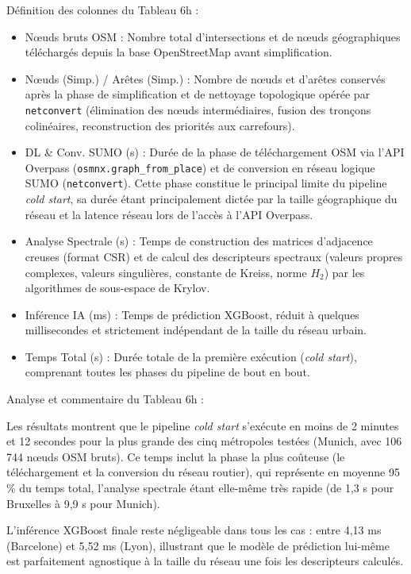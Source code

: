 \documentclass[10pt, a4paper]{article}
\providecommand{\tightlist}{}
\begin{document}
Définition des colonnes du Tableau 6h :

\begin{itemize}
\tightlist
\item
  Nœuds bruts OSM : Nombre total d'intersections et de nœuds
  géographiques téléchargés depuis la base OpenStreetMap avant
  simplification.
\item
  Nœuds (Simp.) / Arêtes (Simp.) : Nombre de nœuds et d'arêtes conservés
  après la phase de simplification et de nettoyage topologique opérée
  par \texttt{netconvert} (élimination des nœuds intermédiaires, fusion
  des tronçons colinéaires, reconstruction des priorités aux
  carrefours).
\item
  DL \& Conv. SUMO (s) : Durée de la phase de téléchargement OSM via
  l'API Overpass (\texttt{osmnx.graph\_from\_place}) et de conversion en
  réseau logique SUMO (\texttt{netconvert}). Cette phase constitue le
  principal limite du pipeline \emph{cold start}, sa durée étant
  principalement dictée par la taille géographique du réseau et la
  latence réseau lors de l'accès à l'API Overpass.
\item
  Analyse Spectrale (s) : Temps de construction des matrices d'adjacence
  creuses (format CSR) et de calcul des descripteurs spectraux (valeurs
  propres complexes, valeurs singulières, constante de Kreiss, norme
  \(H_2\)) par les algorithmes de sous-espace de Krylov.
\item
  Inférence IA (ms) : Temps de prédiction XGBoost, réduit à quelques
  millisecondes et strictement indépendant de la taille du réseau
  urbain.
\item
  Temps Total (s) : Durée totale de la première exécution (\emph{cold
  start}), comprenant toutes les phases du pipeline de bout en bout.
\end{itemize}

Analyse et commentaire du Tableau 6h :

Les résultats montrent que le pipeline \emph{cold start} s'exécute en
moins de 2 minutes et 12 secondes pour la plus grande des cinq
métropoles testées (Munich, avec 106 744 nœuds OSM bruts). Ce temps
inclut la phase la plus coûteuse (le téléchargement et la conversion du
réseau routier), qui représente en moyenne 95 \% du temps total,
l'analyse spectrale étant elle-même très rapide (de 1,3 s pour Bruxelles
à 9,9 s pour Munich).

L'inférence XGBoost finale reste négligeable dans tous les cas : entre
4,13 ms (Barcelone) et 5,52 ms (Lyon), illustrant que le modèle de
prédiction lui-même est parfaitement agnostique à la taille du réseau
une fois les descripteurs calculés.
\end{document}
